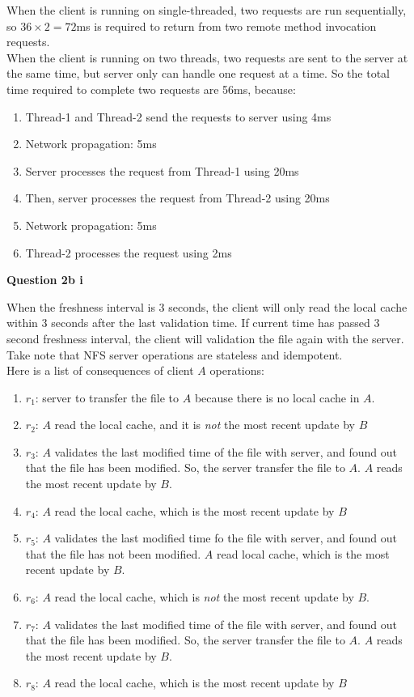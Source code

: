 \documentclass[11pt,a4paper]{report}
\begin{document}
\begin{multicols*}{2}
\noindent When the client is running on single-threaded, two requests are run sequentially, so $36 \times 2 =72$ms is required to return from two remote method invocation requests.\\

\noindent When the client is running on two threads, two requests are sent to the server at the same time, but server only can handle one request at a time. So the total time required to complete two requests are 56ms, because:
\begin{enumerate}
  \item Thread-1 and Thread-2 send the requests to server using 4ms
  \item Network propagation: 5ms
  \item Server processes the request from Thread-1 using 20ms
  \item Then, server processes the request from Thread-2 using 20ms
  \item Network propagation: 5ms
  \item Thread-2 processes the request using 2ms
\end{enumerate}

\noindent \textbf{Question 2b i}

\noindent When the freshness interval is 3 seconds, the client will only read the local cache within 3 seconds after the last validation time. If current time has passed 3 second freshness interval, the client will validation the file again with the server.\\

\noindent Take note that NFS server operations are stateless and idempotent.\\

\noindent Here is a list of consequences of client $A$ operations:
\begin{enumerate}
  \item $r_1$: server to transfer the file to $A$ because there is no local cache in $A$.
  \item $r_2$: $A$ read the local cache, and it is \emph{not} the most recent update by $B$
  \item $r_3$: $A$ validates the last modified time of the file with server, and found out that the file has been modified. So, the server transfer the file to $A$. $A$ reads the most recent update by $B$.
  \item $r_4$: $A$ read the local cache, which is the most recent update by $B$
  \item $r_5$: $A$ validates the last modified time fo the file with server, and found out that the file has not been modified. $A$ read local cache, which is the most recent update by $B$.
  \item $r_6$: $A$ read the local cache, which is \emph{not} the most recent update by $B$.
  \item $r_7$: $A$ validates the last modified time of the file with server, and found out that the file has been modified. So, the server transfer the file to $A$. $A$ reads the most recent update by $B$.
  \item $r_8$: $A$ read the local cache, which is the most recent update by $B$
\end{enumerate}


\end{multicols*}
\end{document}
